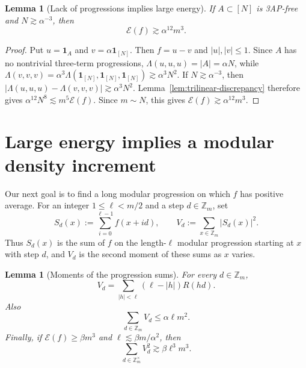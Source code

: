 \documentclass[11pt]{amsart}
\newcommand{\Z}{\mathbb{Z}}
\newcommand{\abs}[1]{\lvert#1\rvert}
\newcommand{\one}{\mathbf{1}}
\numberwithin{equation}{section}
\theoremstyle{plain}
\newtheorem{lemma}[theorem]{Lemma}
\theoremstyle{remark}
\begin{document}
\begin{lemma}[Lack of progressions implies large energy]\label{lem:energy}
If $A\subset[N]$ is 3AP-free and $N\gtrsim\alpha^{-3}$, then
$$
\mathcal E(f)\gtrsim\alpha^{12}m^3.
$$
\end{lemma}

\begin{proof}
Put $u=\one_A$ and $v=\alpha\one_{[N]}$. Then $f=u-v$ and
$\abs{u},\abs{v}\leq1$. Since $A$ has no nontrivial three-term progressions,
$\Lambda(u,u,u)=\abs{A}=\alpha N$, while
$\Lambda(v,v,v)=\alpha^3\Lambda(\one_{[N]},\one_{[N]},\one_{[N]})\gtrsim\alpha^3N^2$.
If $N\gtrsim\alpha^{-3}$, then
$\abs{\Lambda(u,u,u)-\Lambda(v,v,v)}\gtrsim\alpha^3N^2$.
Lemma~\ref{lem:trilinear-discrepancy} therefore gives
$\alpha^{12}N^8\lesssim m^5\mathcal E(f)$. Since $m\sim N$, this gives
$\mathcal E(f)\gtrsim\alpha^{12}m^3$.
\end{proof}

\section{Large energy implies a modular density increment}

Our next goal is to find a long modular progression on which $f$ has positive
average. For an integer $1\leq \ell<m/2$ and a step $d\in\Z_m$, set
$$
S_d(x):=\sum_{i=0}^{\ell-1}f(x+id),\qquad V_d:=\sum_{x\in\Z_m}\abs{S_d(x)}^2.
$$
Thus $S_d(x)$ is the sum of $f$ on the length-$\ell$ modular progression
starting at $x$ with step $d$, and $V_d$ is the second moment of these sums
as $x$ varies.

\begin{lemma}[Moments of the progression sums]\label{lem:v-identity}
For every $d\in\Z_m$,
\begin{equation}\label{eq:v-identity}
V_d=\sum_{\abs{h}<\ell}(\ell-\abs{h})R(hd).
\end{equation}
Also
\begin{equation}\label{eq:v-first-moment}
\sum_{d\in\Z_m}V_d\leq \alpha\ell m^2.
\end{equation}
Finally, if $\mathcal E(f)\geq\beta m^3$ and $\ell\lesssim \beta m/\alpha^2$, then
\begin{equation}\label{eq:v-second-moment-nonzero}
\sum_{d\in\Z_m^\times}V_d^2\gtrsim \beta\ell^3m^3.
\end{equation}
\end{lemma}
\end{document}

